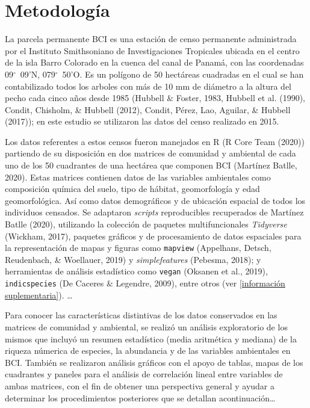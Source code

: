 \documentclass[11pt,]{article}
\begin{document}
\section{Metodología}\label{metodologuxeda}

La parcela permanente BCI es una estación de censo permanente
administrada por el Instituto Smithsoniano de Investigaciones Tropicales
ubicada en el centro de la isla Barro Colorado en la cuenca del canal de
Panamá, con las coordenadas 09\(^\circ\)~09'N, 079\(^\circ\)~50'O. Es un
polígono de 50 hectáreas cuadradas en el cual se han contabilizado todos
los arboles con más de 10 mm de diámetro a la altura del pecho cada
cinco años desde 1985 (Hubbell \& Foster, 1983, Hubbell et al. (1990),
Condit, Chisholm, \& Hubbell (2012), Condit, Pérez, Lao, Aguilar, \&
Hubbell (2017)); en este estudio se utilizaron las datos del censo
realizado en 2015.

Los datos referentes a estos censos fueron manejados en R (R Core Team
(2020)) partiendo de su disposición en dos matrices de comunidad y
ambiental de cada uno de los 50 cuadrantes de una hectárea que componen
BCI (Martínez Batlle, 2020). Estas matrices contienen datos de las
variables ambientales como composición química del suelo, tipo de
hábitat, geomorfología y edad geomorfológica. Así como datos
demográficos y de ubicación espacial de todos los individuos censados.
Se adaptaron \emph{scripts} reproducibles recuperados de Martínez Batlle
(2020), utilizando la colección de paquetes multifuncionales
\emph{Tidyverse} (Wickham, 2017), paquetes gráficos y de procesamiento
de datos espaciales para la representación de mapas y figuras como
\texttt{mapview} (Appelhans, Detsch, Reudenbach, \& Woellauer, 2019) y
\emph{simplefeatures} (Pebesma, 2018); y herramientas de análisis
estadístico como \texttt{vegan} (Oksanen et al., 2019),
\texttt{indicspecies} (De Caceres \& Legendre, 2009), entre otros (ver
\ref{información suplementaria}). \dots

Para conocer las características distintivas de los datos conservados en
las matrices de comunidad y ambiental, se realizó un análisis
exploratorio de los mismos que incluyó un resumen estadístico (media
aritmética y mediana) de la riqueza númerica de especies, la abundancia
y de las variables ambientales en BCI. También se realizaron análisis
gráficos con el apoyo de tablas, mapas de los cuadrantes y paneles para
el análisis de correlación lineal entre variables de ambas matrices, con
el fin de obtener una perspectiva general y ayudar a determinar los
procedimientos posteriores que se detallan acontinuación\ldots{}
\end{document}
